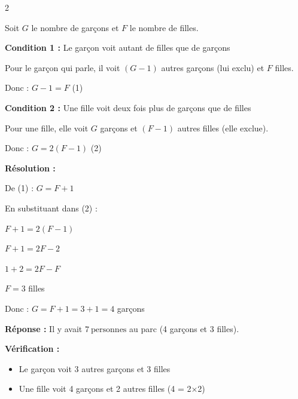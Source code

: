 \documentclass[11pt,a4paper]{article}
\begin{document}
\begin{tcolorbox}[colback=red!5!white,colframe=red!75!black]

\begin{multicols}{2}
    


Soit $G$ le nombre de garçons et $F$ le nombre de filles.

\vspace{2mm}

\textbf{Condition 1 :} Le garçon voit autant de filles que de garçons

Pour le garçon qui parle, il voit $(G-1)$ autres garçons (lui exclu) et $F$ filles.

Donc : $G - 1 = F$ \quad (1)

\vspace{2mm}

\textbf{Condition 2 :} Une fille voit deux fois plus de garçons que de filles

Pour une fille, elle voit $G$ garçons et $(F-1)$ autres filles (elle exclue).

Donc : $G = 2(F-1)$ \quad (2)

\vspace{2mm}

\textbf{Résolution :}

De (1) : $G = F + 1$

En substituant dans (2) : 

$F + 1 = 2(F - 1)$

$F + 1 = 2F - 2$

$1 + 2 = 2F - F$

$F = 3$ filles

\vspace{2mm}

Donc : $G = F + 1 = 3 + 1 = 4$ garçons

\vspace{2mm}

\textbf{Réponse :} Il y avait $\boxed{7~\text{personnes}}$ au parc (4 garçons et 3 filles).

\vspace{2mm}

\textbf{Vérification :}
\begin{itemize}
\item Le garçon voit 3 autres garçons et 3 filles \checkmark
\item Une fille voit 4 garçons et 2 autres filles (4 = 2×2) \checkmark
\end{itemize}

\end{multicols}

\end{tcolorbox}

  \vfill 
  
\end{document}
